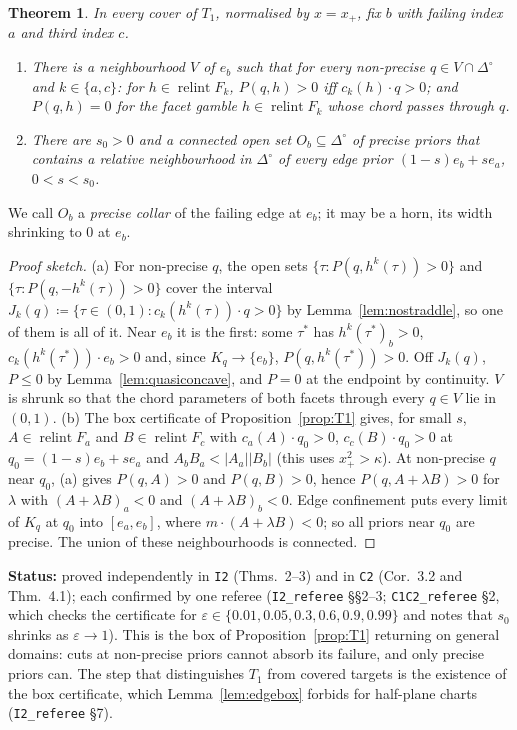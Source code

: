 \documentclass[11pt]{article}
\newtheorem{theorem}{Theorem}[section]
\theoremstyle{definition}
\theoremstyle{remark}
\newcommand{\Di}{\Delta^{\circ}}
\newcommand{\relint}{\operatorname{relint}}
\newcommand{\src}[1]{\texttt{#1}}
\newcommand{\status}[1]{\par\smallskip\noindent\textbf{Status:} #1\par\smallskip}
\begin{document}
\begin{theorem}\label{thm:collar}
In every cover of $T_1$, normalised by $x=x_+$, fix $b$ with failing index $a$ and third index $c$.
\begin{enumerate}[leftmargin=*,label=(\alph*)]
\item There is a neighbourhood $V$ of $e_b$ such that for every non-precise $q\in V\cap\Di$ and $k\in\{a,c\}$: for $h\in\relint F_k$, $P(q,h)>0$ iff $c_k(h)\cdot q>0$; and $P(q,h)=0$ for the facet gamble $h\in\relint F_k$ whose chord passes through $q$.
\item There are $s_0>0$ and a connected open set $O_b\subseteq\Di$ of precise priors that contains a relative neighbourhood in $\Di$ of every edge prior $(1-s)e_b+se_a$, $0<s<s_0$.
\end{enumerate}
\end{theorem}
We call $O_b$ a \emph{precise collar} of the failing edge at $e_b$; it may be a horn, its width shrinking to $0$ at $e_b$.
\begin{proof}[Proof sketch]
(a) For non-precise $q$, the open sets $\{\tau:P(q,h^k(\tau))>0\}$ and $\{\tau:P(q,-h^k(\tau))>0\}$ cover the interval $J_k(q)\coloneqq\{\tau\in(0,1):c_k(h^k(\tau))\cdot q>0\}$ by Lemma~\ref{lem:nostraddle}, so one of them is all of it. Near $e_b$ it is the first: some $\tau^*$ has $h^k(\tau^*)_b>0$, $c_k(h^k(\tau^*))\cdot e_b>0$ and, since $K_q\to\{e_b\}$, $P(q,h^k(\tau^*))>0$. Off $J_k(q)$, $P\le0$ by Lemma~\ref{lem:quasiconcave}, and $P=0$ at the endpoint by continuity. $V$ is shrunk so that the chord parameters of both facets through every $q\in V$ lie in $(0,1)$. (b) The box certificate of Proposition~\ref{prop:T1} gives, for small $s$, $A\in\relint F_a$ and $B\in\relint F_c$ with $c_a(A)\cdot q_0>0$, $c_c(B)\cdot q_0>0$ at $q_0=(1-s)e_b+se_a$ and $A_bB_a<|A_a||B_b|$ (this uses $x_+^2>\kappa$). At non-precise $q$ near $q_0$, (a) gives $P(q,A)>0$ and $P(q,B)>0$, hence $P(q,A+\lambda B)>0$ for $\lambda$ with $(A+\lambda B)_a<0$ and $(A+\lambda B)_b<0$. Edge confinement puts every limit of $K_q$ at $q_0$ into $[e_a,e_b]$, where $m\cdot(A+\lambda B)<0$; so all priors near $q_0$ are precise. The union of these neighbourhoods is connected.
\end{proof}
\status{proved independently in \src{I2} (Thms.~2--3) and in \src{C2} (Cor.~3.2 and Thm.~4.1); each confirmed by one referee (\src{I2\_referee} \S\S2--3; \src{C1C2\_referee} \S2, which checks the certificate for $\varepsilon\in\{0.01,0.05,0.3,0.6,0.9,0.99\}$ and notes that $s_0$ shrinks as $\varepsilon\to1$). This is the box of Proposition~\ref{prop:T1} returning on general domains: cuts at non-precise priors cannot absorb its failure, and only precise priors can. The step that distinguishes $T_1$ from covered targets is the existence of the box certificate, which Lemma~\ref{lem:edgebox} forbids for half-plane charts (\src{I2\_referee} \S7).}
\end{document}
